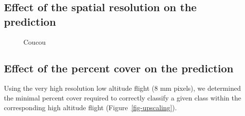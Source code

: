 \documentclass[
  number]{elsarticle}
\begin{document}
\subsection{Effect of the spatial resolution on the
prediction}\label{effect-of-the-spatial-resolution-on-the-prediction}

\label{cell-fig-pixelsize}
\begin{figure}[H]


\caption{\label{fig-pixelsize}Coucou}

\end{figure}%

\subsection{Effect of the percent cover on the
prediction}\label{effect-of-the-percent-cover-on-the-prediction}

Using the very high resolution low altitude flight (8 mm pixels), we
determined the minimal percent cover required to correctly classify a
given class within the corresponding high altitude flight
(Figure~\ref{fig-upscaling}).
\end{document}
